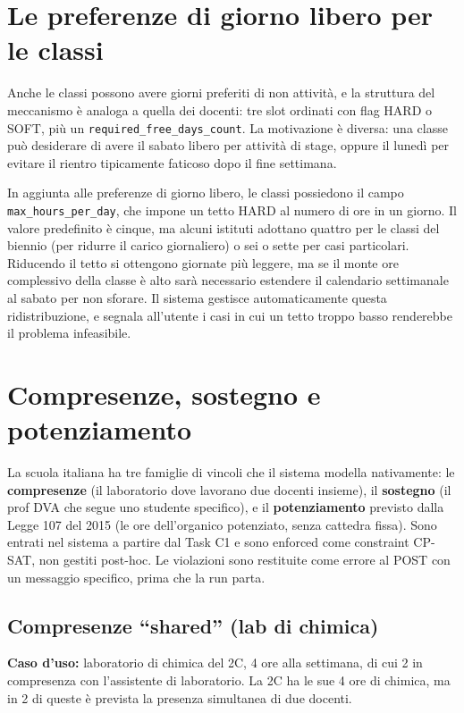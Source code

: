\section{Le preferenze di giorno libero per le classi}

Anche le classi possono avere giorni preferiti di non
attivit\`a, e la struttura del meccanismo \`e analoga a
quella dei docenti: tre slot ordinati con flag HARD o SOFT,
pi\`u un \texttt{required\_free\_days\_count}. La
motivazione \`e diversa: una classe pu\`o desiderare di
avere il sabato libero per attivit\`a di stage, oppure il
luned\`i per evitare il rientro tipicamente faticoso dopo il
fine settimana.

In aggiunta alle preferenze di giorno libero, le classi
possiedono il campo \texttt{max\_hours\_per\_day}, che
impone un tetto HARD al numero di ore in un giorno. Il
valore predefinito \`e cinque, ma alcuni istituti adottano
quattro per le classi del biennio (per ridurre il carico
giornaliero) o sei o sette per casi particolari. Riducendo
il tetto si ottengono giornate pi\`u leggere, ma se il
monte ore complessivo della classe \`e alto sar\`a
necessario estendere il calendario settimanale al sabato per
non sforare. Il sistema gestisce automaticamente questa
ridistribuzione, e segnala all'utente i casi in cui un
tetto troppo basso renderebbe il problema infeasibile.

\section{Compresenze, sostegno e potenziamento}

La scuola italiana ha tre famiglie di vincoli che il
sistema modella nativamente: le \textbf{compresenze} (il
laboratorio dove lavorano due docenti insieme), il
\textbf{sostegno} (il prof DVA che segue uno studente
specifico), e il \textbf{potenziamento} previsto dalla Legge
107 del 2015 (le ore dell'organico potenziato, senza
cattedra fissa). Sono entrati nel sistema a partire dal Task
C1 e sono enforced come constraint CP-SAT, non gestiti
post-hoc. Le violazioni sono restituite come errore al POST
con un messaggio specifico, prima che la run parta.

\subsection{Compresenze ``shared'' (lab di chimica)}

\textbf{Caso d'uso:} laboratorio di chimica del 2C, 4 ore
alla settimana, di cui 2 in compresenza con l'assistente di
laboratorio. La 2C ha le sue 4 ore di chimica, ma in 2 di
queste \`e prevista la presenza simultanea di due docenti.

